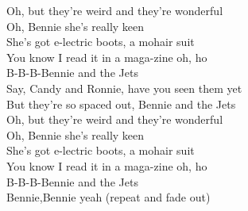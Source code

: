  Oh, but they're weird and they're wonderful\\
Oh,  Bennie she's really keen\\
She's got e-lectric boots, a  mohair suit\\
You know I  read it in a  maga-zine oh,  ho\\
 B-B-B-Bennie and the  Jets  \\
Say,  Candy and Ronnie, have you seen them yet\\
 But they're so spaced out,  Bennie and the  Jets\\
 Oh, but they're weird and they're wonderful\\
Oh,  Bennie she's really keen\\
She's got e-lectric boots, a  mohair suit\\
You know I  read it in a maga-zine oh,  ho\\
 B-B-B-Bennie and the  Jets  \\
 Bennie,Bennie   yeah   (repeat and fade out)
